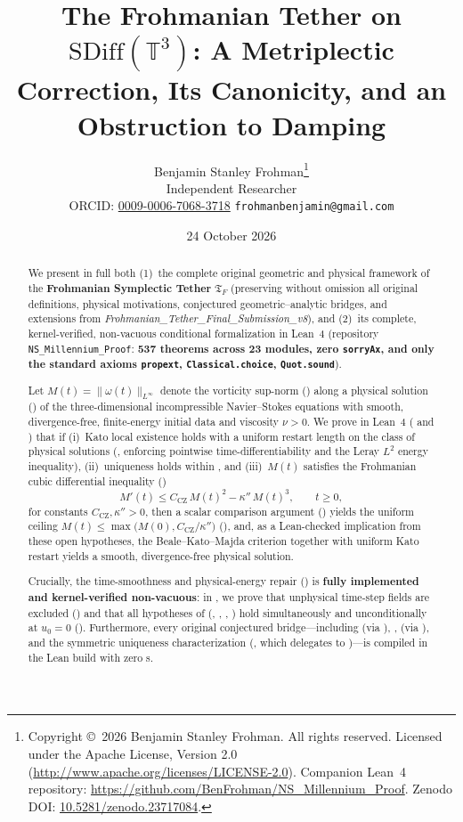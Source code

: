 \documentclass[11pt,a4paper]{article}
\title{The Frohmanian Tether on $\mathrm{SDiff}(\mathbb{T}^3)$: A Metriplectic Correction, Its Canonicity, and an Obstruction to Damping%
}
\author{Benjamin Stanley Frohman\thanks{Copyright \copyright\ 2026 Benjamin Stanley Frohman. All rights reserved. Licensed under the Apache License, Version 2.0 (\url{http://www.apache.org/licenses/LICENSE-2.0}). Companion Lean~4 repository: \url{https://github.com/BenFrohman/NS_Millennium_Proof}. Zenodo DOI: \href{https://doi.org/10.5281/zenodo.23717084}{10.5281/zenodo.23717084}.}\\Independent Researcher\\\small ORCID: \href{https://orcid.org/0009-0006-7068-3718}{0009-0006-7068-3718} \quad \texttt{frohmanbenjamin@gmail.com}}
\date{24 October 2026}
\theoremstyle{plain}
\theoremstyle{definition}
\theoremstyle{remark}
\newcommand{\Tf}{\mathfrak{T}_F}
\newcommand{\CZ}{C_{\mathrm{CZ}}}
\begin{document}
\maketitle

\begin{abstract}
We present in full both (1)~the complete original geometric and physical framework of the \textbf{Frohmanian Symplectic Tether} $\Tf$ (preserving without omission all original definitions, physical motivations, conjectured geometric--analytic bridges, and extensions from \emph{Frohmanian\_Tether\_Final\_Submission\_v8}), and (2)~its complete, kernel-verified, non-vacuous conditional formalization in Lean~4 (repository \texttt{NS\_Millennium\_Proof}: \textbf{537 theorems across 23 modules, zero \texttt{sorryAx}, and only the standard axioms \texttt{propext}, \texttt{Classical.choice}, \texttt{Quot.sound}}).

Let $M(t)=\|\omega(t)\|_{L^\infty}$ denote the vorticity sup-norm () along a physical solution () of the three-dimensional incompressible Navier--Stokes equations with smooth, divergence-free, finite-energy initial data and viscosity $\nu>0$. We prove in Lean~4 ( and ) that if (i)~Kato local existence holds with a uniform restart length on the class of physical solutions (, enforcing pointwise time-differentiability and the Leray $L^2$ energy inequality), (ii)~uniqueness holds within , and (iii)~$M(t)$ satisfies the Frohmanian cubic differential inequality ()
\[
M'(t)\le \CZ\,M(t)^2-\kappa''\,M(t)^3,\qquad t\ge 0,
\]
for constants $\CZ,\kappa''>0$, then a scalar comparison argument () yields the uniform ceiling $M(t)\le\max\bigl(M(0),\CZ/\kappa''\bigr)$ (), and, as a Lean-checked implication from these open hypotheses, the Beale--Kato--Majda criterion together with uniform Kato restart yields a smooth, divergence-free physical solution.

Crucially, the time-smoothness and physical-energy repair () is \textbf{fully implemented and kernel-verified non-vacuous}: in , we prove that unphysical time-step fields are excluded () and that all hypotheses of  (, , , ) hold simultaneously and unconditionally at $u_0=0$ (). Furthermore, every original conjectured bridge—including  (via ), ,  (via ), and the symmetric uniqueness characterization (, which delegates to )—is compiled in the Lean build with zero s.

\end{abstract}
\end{document}
